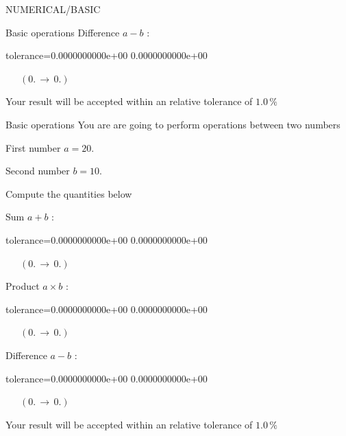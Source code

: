 \documentclass[12pt]{article}
\begin{document}
\begin{quiz}{NUMERICAL/BASIC}
\begin{cloze}{Basic operations}
Difference $ a - b $ : 
\begin{numerical}[points=1] 
\item[tolerance={0.0000000000e+00}] 0.0000000000e+00 
\end{numerical} 
 $\,$ 
 $ \quad (0. \, \rightarrow \, 0.) $ 

Your result will be accepted within an relative tolerance of $1.0\, \% $

\end{cloze} 


 \begin{cloze}{Basic operations} 
You are are going to perform operations between two numbers

First number $a = 20.\, $

Second number $b = 10.\, $

 

Compute the quantities below

Sum $ a + b $ : 
\begin{numerical}[points=1] 
\item[tolerance={0.0000000000e+00}] 0.0000000000e+00 
\end{numerical} 
 $\,$ 
 $ \quad (0. \, \rightarrow \, 0.) $ 

Product $ a \times b $ : 
\begin{numerical}[points=1] 
\item[tolerance={0.0000000000e+00}] 0.0000000000e+00 
\end{numerical} 
 $\,$ 
 $ \quad (0. \, \rightarrow \, 0.) $ 

Difference $ a - b $ : 
\begin{numerical}[points=1] 
\item[tolerance={0.0000000000e+00}] 0.0000000000e+00 
\end{numerical} 
 $\,$ 
 $ \quad (0. \, \rightarrow \, 0.) $ 

Your result will be accepted within an relative tolerance of $1.0\, \% $

\end{cloze} 


\end{quiz}
\end{document}
